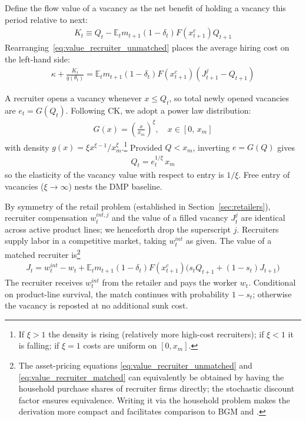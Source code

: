 \documentclass[authoryear, review, 12pt]{elsarticle}
\begin{document}
	Define the flow value of a vacancy as the net benefit of 
	holding a vacancy this period relative to next:
	\begin{align}\label{eq:K}
		K_t \equiv Q_t - 
		\mathbb{E}_t m_{t+1}(1-\delta_t)F(x_{t+1}^c)Q_{t+1}
	\end{align}
	Rearranging~\eqref{eq:value_recruiter_unmatched} places the 
	average hiring cost on the left-hand side:
	\begin{align}\label{eq:average_hiring_cost}
		\kappa+\frac{K_t}{q(\theta_t)} = 
		\mathbb{E}_t m_{t+1}(1-\delta_t)F(x_{t+1}^c)
		(J_{t+1}^j-Q_{t+1})
	\end{align}
	
	A recruiter opens a vacancy whenever $x\leq Q_t$, so total 
	newly opened vacancies are $e_t=G(Q_t)$. Following CK, we 
	adopt a power law distribution:
	\begin{align}
		G(x)=\left(\frac{x}{x_m}\right)^{\xi}, 
		\quad x\in[0,\,x_m]
	\end{align}
	with density $g(x)=\xi x^{\xi-1}/x_m^{\xi}$.\footnote{If 
		$\xi>1$ the density is rising (relatively more high-cost 
		recruiters); if $\xi<1$ it is falling; if $\xi=1$ costs are 
		uniform on $[0,x_m]$.} Provided $Q<x_m$, inverting $e=G(Q)$ 
	gives
	\begin{align}\label{eq:Q}
		Q_t = e_t^{1/\xi}\,x_m
	\end{align}
	so the elasticity of the vacancy value with respect to entry 
	is $1/\xi$. Free entry of vacancies ($\xi\to\infty$) nests 
	the DMP baseline.
	
	By symmetry of the retail problem (established in 
	Section~\ref{sec:retailers}), recruiter compensation 
	$w_t^{int,j}$ and the value of a filled vacancy $J_t^j$ are 
	identical across active product lines; we henceforth drop the 
	superscript $j$. Recruiters supply labor in a competitive 
	market, taking $w_t^{int}$ as given. The value of a matched 
	recruiter is\footnote{The asset-pricing equations 
		\eqref{eq:value_recruiter_unmatched} and 
		\eqref{eq:value_recruiter_matched} can equivalently be obtained 
		by having the household purchase shares of recruiter firms 
		directly; the stochastic discount factor ensures equivalence. 
		Writing it via the household problem makes the derivation more 
		compact and facilitates comparison to BGM and 
		\citet{mortensen_1994}.}
	\begin{align}\label{eq:value_recruiter_matched}
		J_{t} = w_t^{int}-w_t + \mathbb{E}_{t}m_{t+1}
		(1-\delta_t)F(x_{t+1}^c)
		\bigl(s_t Q_{t+1}+(1-s_t)J_{t+1}\bigr)
	\end{align}
	The recruiter receives $w_t^{int}$ from the retailer and 
	pays the worker $w_t$. Conditional on product-line survival, 
	the match continues with probability $1-s_t$; otherwise the 
	vacancy is reposted at no additional sunk cost.
	
\end{document}

